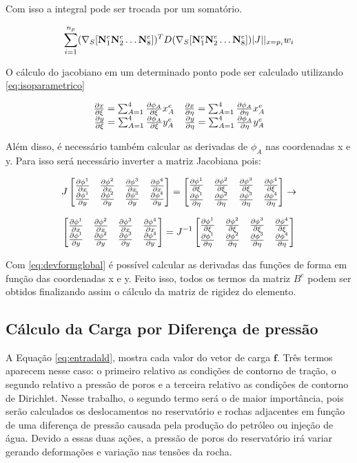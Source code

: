 Com isso a integral pode ser trocada por um somatório.

\begin{equation}
    \sum^{n_p}_{i=1} (\sopnabla [\basefunctionelem[1] \basefunctionelem[2] \hdots \basefunctionelem[8] ]) ^T D (\sopnabla [\basefunctionelem[1] \basefunctionelem[2] \hdots \basefunctionelem[8]])|J||_{x=p_i} w_i
\end{equation}

O cálculo do jacobiano em um determinado ponto pode ser calculado utilizando \eqref{eq:isoparametrico}

\begin{equation}\label{eq:jacobianoderivadas}
\begin{matrix}
\dxi[x] = \sum^4_{A=1} \dxi[\phi_A] x^e_A &  \deta[x] = \sum^4_{A=1} \deta[\phi_A] x^e_A\\
\dxi[y] = \sum^4_{A=1} \dxi[\phi_A] y^e_A &  \deta[y] = \sum^4_{A=1} \deta[\phi_A] y^e_A
\end{matrix}
\end{equation}


Além disso, é necessário também calcular as derivadas de $\phi_A$ nas coordenadas x e y.  Para isso será necessário inverter a matriz Jacobiana pois:


\begin{equation}
J \deriv = \der \rightarrow
\end{equation}

\begin{equation} \label{eq:devformglobal}
     \deriv = J ^{-1}\der
\end{equation}

Com \eqref{eq:devformglobal}  é possível calcular as derivadas das funções de forma em função das coordenadas x e y. Feito isso, todos os termos da matriz $B^e$ podem ser obtidos finalizando assim o cálculo da matriz de rigidez do elemento.



\subsection{Cálculo da Carga por Diferença de pressão}

A Equação \eqref{eq:entradald}, mostra cada valor do vetor de carga $\mathbf{f}$. Três termos aparecem nesse caso: o primeiro relativo as condições de contorno de tração, o segundo relativo a pressão de poros e a terceira relativo as condições de contorno de Dirichlet. Nesse trabalho, o segundo termo será o de maior importância, pois serão calculados os deslocamentos no reservatório e rochas adjacentes em função de uma diferença de pressão causada pela produção do petróleo ou injeção de água. Devido a essas duas ações, a pressão de poros do reservatório irá variar gerando deformações e variação nas tensões da rocha.

